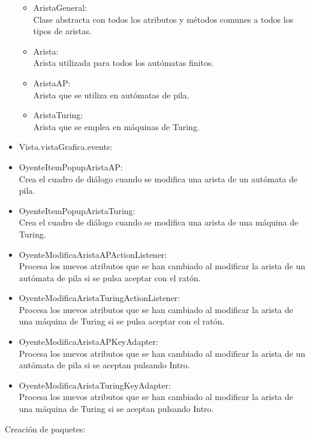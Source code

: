 \documentclass[12pt,a4paper,spanish]{book}
\begin{document}
\begin{itemize}
\begin{itemize}
\item AristaGeneral:\\Clase abstracta con todos los atributos y m\'etodos comunes a todos los tipos de aristas.
\item Arista:\\Arista utilizada para todos los aut\'omatas finitos.
\item AristaAP:\\Arista que se utiliza en aut\'omatas de pila.
\item AristaTuring:\\Arista que se emplea en m\'aquinas de Turing.\\
\end{itemize}
\item Vista.vistaGrafica.events:
\item OyenteItemPopupAristaAP:\\Crea el cuadro de di\'alogo cuando se modifica una arista de un aut\'omata de pila.
\item OyenteItemPopupAristaTuring:\\Crea el cuadro de di\'alogo cuando se modifica una arista de una m\'aquina de Turing.
\item OyenteModificaAristaAPActionListener:\\Procesa los nuevos atributos que se han cambiado al modificar la arista de un aut\'omata de pila si se pulsa aceptar con el rat\'on.
\item OyenteModificaAristaTuringActionListener:\\Procesa los nuevos atributos que se han cambiado al modificar la arista de una m\'aquina de Turing si se pulsa aceptar con el rat\'on.
\item OyenteModificaAristaAPKeyAdapter:\\Procesa los nuevos atributos que se han cambiado al modificar la arista de un aut\'omata de pila si se aceptan pulsando Intro.
\item OyenteModificaAristaTuringKeyAdapter:\\Procesa los nuevos atributos que se han cambiado al modificar la arista de una m\'aquina de Turing si se aceptan pulsando Intro.
\end{itemize}
\newpage
Creaci\'on de paquetes:\\
\end{document}
